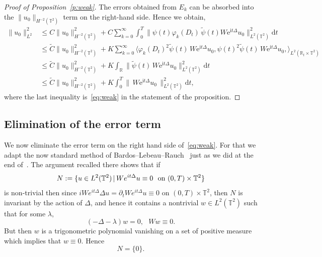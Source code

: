\documentclass[11pt]{article}
\theoremstyle{definition}
\numberwithin{equation}{section}
\numberwithin{figure}{section}
\numberwithin{table}{section}
\newcommand{\R}{{\mathbb R}}
\newcommand{\TT}{{\mathbb T}}
\newcommand*{\dd}{\mathrm{d}}
\newcommand*{\dt}{\dd t}
\newcommand*{\tq}{\,|\,}
\begin{document}
\begin{proof}[Proof of Proposition~\ref{p:weak}]
The errors obtained from $ E_k $ can be absorbed into the $
\| u_0 \|_{ H^{-2} (\TT^2) } $ term on the right-hand side. Hence we obtain,
\begin{align*}
\|u_0 \|^2_{L^2} &\leq C \|u_0 \|_{H^{-2} (\TT^2)} ^2+ C \sum_{k=0}^\infty \int_{0}^T
\| \psi (t) \varphi_{k}(D_t)\, \widetilde \psi (t) W \mathrm{e}^{ \mathrm{i}t \Delta }u_0 \|^2_{L^2(\TT^2)} \dt\\
& \leq\widetilde C \|u_0 \|_{H^{-2} (\TT^2)} ^2+ K \sum_{k=0}^\infty
\langle \varphi_{k}(D_t)^2 \widetilde \psi (t) \, W \mathrm{e}^{\mathrm{i}t \Delta }u_0, \psi(t)^2 \widetilde \psi(t)\, W \mathrm{e}^{\mathrm{i}t \Delta}u_0, \rangle_{L^2 (\R_t \times \TT^2)} \\
& \leq \widetilde C \|u_0 \|_{H^{-2} (\TT^2)} ^2 + K \int_\R \| \widetilde \psi (t) \, W \mathrm{e}^{\mathrm{i}t \Delta} u_0\|^2_{L^2(\TT^2)} \dt \\
& \leq \widetilde C \|u_0 \|_{H^{-2} (\TT^2)} ^2 + K \int_{0}^T \|\, W\mathrm{e}^{\mathrm{i}t \Delta } u_0\, \|^2_{L^2(\TT^2)} \dt,
\end{align*}
where the last inequality is~\eqref{eq:weak} in the statement of the proposition.
\end{proof}

\subsection{Elimination of the error term}\label{eli}

We now eliminate the error term on the right hand side of~\eqref{eq:weak}. For that we adapt the now standard method of Bardos--Lebeau--Rauch~\cite{BLR} just as we did at the end of~\cite[Section~4]{BZ4}. The argument recalled there shows that if
\begin{equation}\label{eq:defN0}
N := \{ u \in L^2 (\TT^2) \tq W e^{ i t \Delta } u \equiv 0
\ \text{ on $ (0, T) \times \TT^2 $}\}
\end{equation}
is non-trivial then since $ iW e^{it\Delta } \Delta u= \partial_t W e^{ i t \Delta } u \equiv 0$ on $ (0, T) \times \TT^2 $, then $N$ is invariant by the action of $\Delta$, and hence it contains a nontrivial $ w \in L^2 (\TT^2) $ such that for some $ \lambda $,
\[
(- \Delta - \lambda) w = 0, \ \ \ W w \equiv 0.
\]
But then $ w $ is a trigonometric polynomial vanishing on a set of positive measure which implies that $ w \equiv 0 $. Hence
\begin{equation}\label{eq:N0}
N = \{ 0 \}.
\end{equation}
\end{document}
